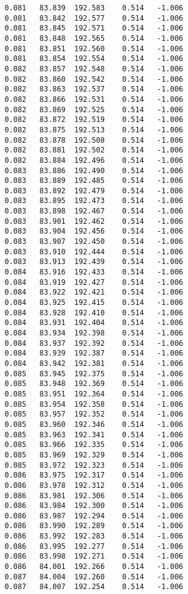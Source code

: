 \begin{verbatim}
   0.081   83.839  192.583    0.514   -1.006
   0.081   83.842  192.577    0.514   -1.006
   0.081   83.845  192.571    0.514   -1.006
   0.081   83.848  192.565    0.514   -1.006
   0.081   83.851  192.560    0.514   -1.006
   0.081   83.854  192.554    0.514   -1.006
   0.082   83.857  192.548    0.514   -1.006
   0.082   83.860  192.542    0.514   -1.006
   0.082   83.863  192.537    0.514   -1.006
   0.082   83.866  192.531    0.514   -1.006
   0.082   83.869  192.525    0.514   -1.006
   0.082   83.872  192.519    0.514   -1.006
   0.082   83.875  192.513    0.514   -1.006
   0.082   83.878  192.508    0.514   -1.006
   0.082   83.881  192.502    0.514   -1.006
   0.082   83.884  192.496    0.514   -1.006
   0.083   83.886  192.490    0.514   -1.006
   0.083   83.889  192.485    0.514   -1.006
   0.083   83.892  192.479    0.514   -1.006
   0.083   83.895  192.473    0.514   -1.006
   0.083   83.898  192.467    0.514   -1.006
   0.083   83.901  192.462    0.514   -1.006
   0.083   83.904  192.456    0.514   -1.006
   0.083   83.907  192.450    0.514   -1.006
   0.083   83.910  192.444    0.514   -1.006
   0.083   83.913  192.439    0.514   -1.006
   0.084   83.916  192.433    0.514   -1.006
   0.084   83.919  192.427    0.514   -1.006
   0.084   83.922  192.421    0.514   -1.006
   0.084   83.925  192.415    0.514   -1.006
   0.084   83.928  192.410    0.514   -1.006
   0.084   83.931  192.404    0.514   -1.006
   0.084   83.934  192.398    0.514   -1.006
   0.084   83.937  192.392    0.514   -1.006
   0.084   83.939  192.387    0.514   -1.006
   0.084   83.942  192.381    0.514   -1.006
   0.085   83.945  192.375    0.514   -1.006
   0.085   83.948  192.369    0.514   -1.006
   0.085   83.951  192.364    0.514   -1.006
   0.085   83.954  192.358    0.514   -1.006
   0.085   83.957  192.352    0.514   -1.006
   0.085   83.960  192.346    0.514   -1.006
   0.085   83.963  192.341    0.514   -1.006
   0.085   83.966  192.335    0.514   -1.006
   0.085   83.969  192.329    0.514   -1.006
   0.085   83.972  192.323    0.514   -1.006
   0.086   83.975  192.317    0.514   -1.006
   0.086   83.978  192.312    0.514   -1.006
   0.086   83.981  192.306    0.514   -1.006
   0.086   83.984  192.300    0.514   -1.006
   0.086   83.987  192.294    0.514   -1.006
   0.086   83.990  192.289    0.514   -1.006
   0.086   83.992  192.283    0.514   -1.006
   0.086   83.995  192.277    0.514   -1.006
   0.086   83.998  192.271    0.514   -1.006
   0.086   84.001  192.266    0.514   -1.006
   0.087   84.004  192.260    0.514   -1.006
   0.087   84.007  192.254    0.514   -1.006

\end{verbatim}
